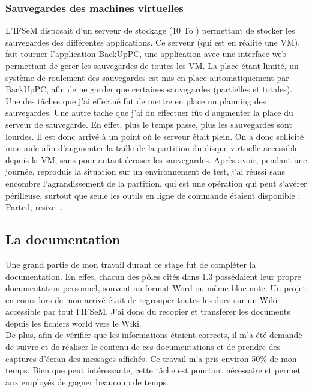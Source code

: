 \subsubsection{Sauvegardes des machines virtuelles}
L'IFSeM disposait d'un serveur de stockage (10 To ) permettant de stocker les sauvegardes des différentes applications. Ce serveur (qui est en réalité une VM), fait tourner l'application BackUpPC, une application avec une interface web permettant de gerer les sauvegardes de toutes les VM. La place étant limité, un système de roulement des sauvegardes est mis en place automatiquement par BackUpPC, afin de ne garder que certaines sauvegardes (partielles et totales). \\
Une des tâches que j'ai effectué fut de mettre en place un planning des sauvegardes. Une autre tache que j'ai du effectuer fût d'augmenter la place du serveur de sauvegarde. En effet, plus le temps passe, plus les sauvegardes sont lourdes. Il est donc arrivé à un point où le serveur était plein. On a donc sollicité mon aide afin d'augmenter la taille de la partition du disque virtuelle accessible depuis la VM, sans pour autant écraser les sauvegardes. Après avoir, pendant une journée, reproduis la situation sur un environnement de test, j'ai réussi sans encombre l'agrandissement de la partition, qui est une opération qui peut s'avérer périlleuse, surtout que seule les outils en ligne de commande étaient disponible : Parted, resize ...

\subsection{La documentation}
Une grand partie de mon travail durant ce stage fut de compléter la documentation. En effet, chacun des pôles cités dans 1.3 possédaient leur propre documentation personnel, souvent au format Word ou même bloc-note. Un projet en cours lors de mon arrivé était de regrouper toutes les docs sur un Wiki accessible par tout l'IFSeM. J'ai donc du recopier et transférer les documents depuis les fichiers world vers le Wiki. \\
De plus, afin de vérifier que les informations étaient corrects, il m'a été demandé de suivre et de réaliser le contenu de ces documentations et de prendre des captures d'écran des messages affichés. 
Ce travail m'a pris environ 50\% de mon temps. Bien que peut intéressante, cette tâche est pourtant nécessaire et permet aux employés de gagner beaucoup de temps. 